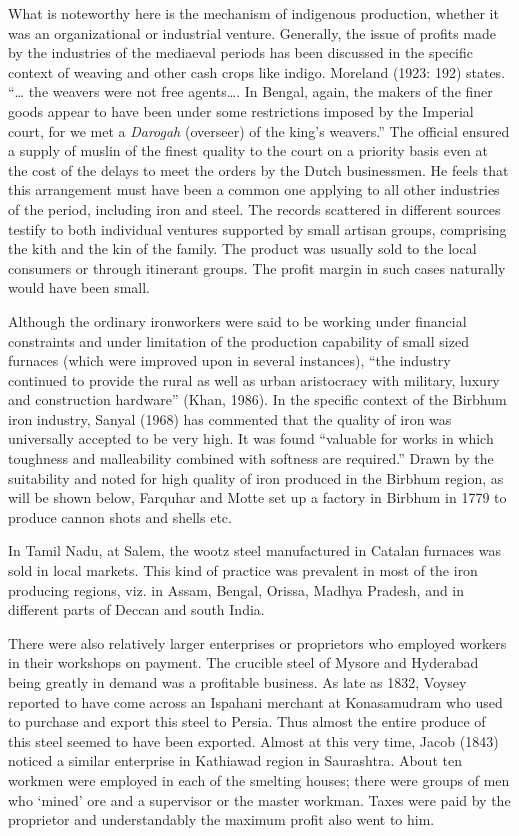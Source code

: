 What is noteworthy here is the mechanism of indigenous production, whether it was an organizational or industrial venture. Generally, the issue of profits made by the industries of the mediaeval periods has been discussed in the specific context of weaving and other cash crops like indigo. Moreland (1923: 192) states. “… the weavers were not free agents…. In Bengal, again, the makers of the finer goods appear to have been under some restrictions imposed by the Imperial court, for we met a {\it Darogah} (overseer) of the king’s weavers.” The official ensured a supply of muslin of the finest quality to the court on a priority basis even at the cost of the delays to meet the orders by the Dutch businessmen. He feels that this arrangement must have been a common one applying to all other industries of the period, including iron and steel. The records scattered in different sources testify to both individual ventures supported by small artisan groups, comprising the kith and the kin of the family. The product was usually sold to the local consumers or through itinerant groups. The profit margin in such cases naturally would have been small.

Although the ordinary ironworkers were said to be working under financial constraints and under limitation of the production capability of small sized furnaces (which were improved upon in several instances), “the industry continued to provide the rural as well as urban aristocracy with military, luxury and construction hardware” (Khan, 1986). In the specific context of the Birbhum iron industry, Sanyal (1968) has commented that the quality of iron was universally accepted to be very high. It was found “valuable for works in which toughness and malleability combined with softness are required.” Drawn by the suitability and noted for high quality of iron produced in the Birbhum region, as will be shown below, Farquhar and Motte set up a factory in Birbhum in 1779 to produce cannon shots and shells etc. 

In Tamil Nadu, at Salem, the wootz steel manufactured in Catalan furnaces was sold in local markets. This kind of practice was prevalent in most of the iron producing regions, viz. in Assam, Bengal, Orissa, Madhya Pradesh, and in different parts of Deccan and south India.

There were also relatively larger enterprises or proprietors who employed workers in their workshops on payment. The crucible steel of Mysore and Hyderabad being greatly in demand was a profitable business. As late as 1832, Voysey reported to have come across an Ispahani merchant at Konasamudram who used to purchase and export this steel to Persia. Thus almost the entire produce of this steel seemed to have been exported. Almost at this very time, Jacob (1843) noticed a similar enterprise in Kathiawad region in Saurashtra. About ten workmen were employed in each of the smelting houses; there were groups of men who ‘mined’ ore and a supervisor or the master workman. Taxes were paid by the proprietor and understandably the maximum profit also went to him.

